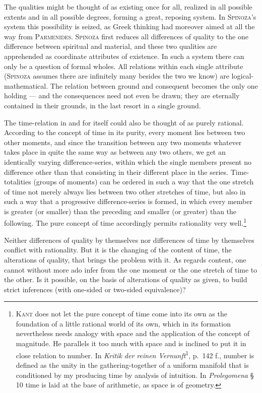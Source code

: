 \documentclass[12pt]{book}
\begin{document}
The qualities might be thought of as existing once for all, realized in all
possible extents and in all possible degrees, forming a great, reposing system.
In \textsc{Spinoza}'s system this possibility is seized, as Greek thinking had
moreover aimed at all the way from \textsc{Parmenides}. \textsc{Spinoza} first
reduces all differences of quality to the one difference between spiritual and
material, and these two qualities are apprehended as coordinate attributes of
existence. In such a system there can only be a question of formal wholes. All
relations within each single attribute (\textsc{Spinoza} assumes there are
infinitely many besides the two we know) are logical-mathematical. The relation
between ground and consequent becomes the only one holding --- and the
consequences need not even be drawn; they are eternally contained in their
grounds, in the last resort in a single ground.

The time-relation in and for itself could also be thought of as purely rational.
According to the concept of time in its purity, every moment lies between two
other moments, and since the transition between any two moments whatever takes
place in quite the same way as between any two others, we get an identically
varying difference-series, within which the single members present no difference
other than that consisting in their different place in the series. Time-totalities
(groups of moments) can be ordered in such a way that the one stretch of time not
merely always lies between two other stretches of time, but also in such a way
that a progressive difference-series is formed, in which every member is greater
(or smaller) than the preceding and smaller (or greater) than the following. The
pure concept of time accordingly permits rationality very
well.\footnote{\textsc{Kant} does not let the pure concept of time come into its
own as the foundation of a little rational world of its own, which in its
formation nevertheless needs analogy with space and the application of the
concept of magnitude. He parallels it too much with space and is inclined to put
it in close relation to number. In \textit{Kritik der reinen
Vernunft}\textsuperscript{1}, p.\ 142 f., number is defined as the unity in the
gathering-together of a uniform manifold that is conditioned by my producing time
by analysis of intuition. In \textit{Prolegomena} § 10 time is laid at the base of
arithmetic, as space is of geometry.}

Neither differences of quality by themselves nor differences of time by themselves
conflict with rationality. But it is the changing of the content of time, the
alterations of quality, that brings the problem with it. As regards content, one
cannot without more ado infer from the one moment or the one stretch of time to
the other. Is it possible, on the basis of alterations of quality as given, to
build strict inferences (with one-sided or two-sided equivalence)?
\end{document}
